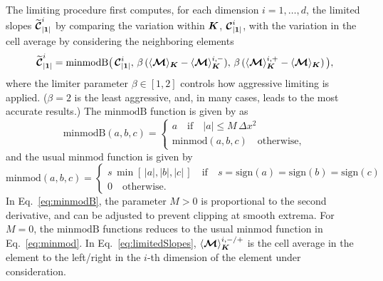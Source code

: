 \documentclass[10pt,preprint]{aastex}
\begin{document}
The limiting procedure first computes, for each dimension $i=1,\ldots,d$, the limited slopes $\widetilde{\boldsymbol{\mathcal{C}}}_{|\boldsymbol{1}|}^{i}$ by comparing the variation within $\boldsymbol{K}$, $\boldsymbol{\mathcal{C}}_{|\boldsymbol{1}|}^{i}$, with the variation in the cell average by considering the neighboring elements
\begin{equation}
  \widetilde{\boldsymbol{\mathcal{C}}}_{|\boldsymbol{1}|}^{i}
  =\text{minmodB}
  \big(\,
    \boldsymbol{\mathcal{C}}_{|\boldsymbol{1}|}^{i},\,
    \beta\,(\langle\boldsymbol{\mathcal{M}}\rangle_{\boldsymbol{K}}-\langle\boldsymbol{\mathcal{M}}\rangle_{\boldsymbol{K}}^{i,-}),\,
    \beta\,(\langle\boldsymbol{\mathcal{M}}\rangle_{\boldsymbol{K}}^{i,+}-\langle\boldsymbol{\mathcal{M}}\rangle_{\boldsymbol{K}})
  \,\big),
  \label{eq:limitedSlopes}
\end{equation}
where the limiter parameter $\beta\in[1,2]$ controls how aggressive limiting is applied.  
($\beta=2$ is the least aggressive, and, in many cases, leads to the most accurate results.)  
The $\text{minmodB}$ function is given by \citet{cockburnShu_2001} as
\begin{equation}
  \mbox{minmodB}(a,b,c)
  =\left\{\begin{array}{ll}
  a \quad\text{if}\quad |a|\le M\,\Delta x^{2} \\
  \mbox{minmod}(a,b,c) \quad \text{otherwise},
  \end{array}\right.
  \label{eq:minmodB}
\end{equation}
and the usual $\text{minmod}$ function is given by
\begin{equation}
  \mbox{minmod}(a,b,c)
  =\left\{\begin{array}{ll}
  s\,\min[\,|a|,|b|,|c|\,] \quad\text{if}\quad s=\mbox{sign}(a)=\mbox{sign}(b)=\mbox{sign}(c) \\
  0 \quad \text{otherwise}.
  \end{array}\right.
  \label{eq:minmod}
\end{equation}
In Eq.~\eqref{eq:minmodB}, the parameter $M>0$ is proportional to the second derivative, and can be adjusted to prevent clipping at smooth extrema.  
For $M=0$, the $\text{minmodB}$ functions reduces to the usual minmod function in Eq.~\eqref{eq:minmod}.  
In Eq.~\eqref{eq:limitedSlopes}, $\langle\boldsymbol{\mathcal{M}}\rangle_{\boldsymbol{K}}^{i,-/+}$ is the cell average in the element to the left/right in the $i$-th dimension of the element under consideration.  
\end{document}
